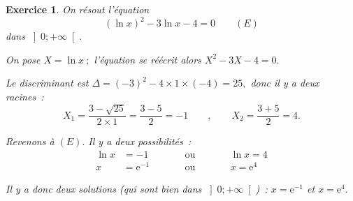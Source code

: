\documentclass[10pt]{article}
\newtheorem{exo}{Exercice}
\begin{document}
\begin{exo}


On résout l'équation \[\left(\ln x\right)^2-3\ln x-4=0\qquad (E)\] dans $\left]0;+\infty\right[.$

\medskip

On pose $X=\ln x~;$ l'équation se réécrit alors $X^2-3X-4=0.$

Le discriminant est $\Delta=(-3)^2-4\times 1\times (-4)=25,$ donc il y a deux racines~:
\[X_1=\frac{3-\sqrt{25}}{2\times 1}=\frac{3-5}{2}=-1\qquad,\qquad X_2=\frac{3+5}{2}=4.\]

Revenons à $(E).$ Il y a deux possibilités~:
\begin{align*}\ln x&=-1&\qquad&\text{ou}&\qquad& \ln x=4
\\ x&=\text{e}^{-1}&\qquad&\text{ou}&\qquad&x=\text{e}^4
\end{align*}

Il y a donc deux solutions (qui sont bien dans $\left]0;+\infty\right[$)~: $x=\text{e}^{-1}$ et $x=\text{e}^4.$

\end{exo}
\end{document}
